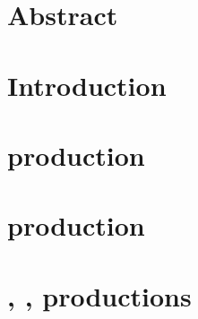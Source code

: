 

\section*{Abstract}


\section{Introduction}
\label{sec:intro}


\section{\texorpdfstring{\ttbar}{ttbar} production}

\label{sec:tt}

\section{\texorpdfstring{\tW}{tW} production} 

\label{sec:tW}

\section{\texorpdfstring{\ttgamma, \ttcc, \ttbb}{ttXX} productions}

\label{sec:ttX}

%


